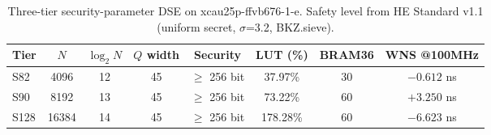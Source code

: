 \begin{table}[htbp]
\centering
\caption{Three-tier security-parameter DSE on xcau25p-ffvb676-1-e.
Safety level from HE Standard v1.1 (uniform secret, $\sigma$=3.2, BKZ.sieve).}
\label{tab:three_tier}
\footnotesize
\begin{tabular}{lccccccc}
\toprule
Tier & $N$ & $\log_2 N$ & $Q$ width & Security & LUT (\%) & BRAM36 & WNS @100MHz \\
\midrule
S82  & 4096  & 12 & 45 & $\ge$ 256 bit &  37.97\% & 30 & $-0.612$ ns \\
S90  & 8192  & 13 & 45 & $\ge$ 256 bit &  73.22\% & 60 & $+3.250$ ns \\
S128 & 16384 & 14 & 45 & $\ge$ 256 bit & 178.28\% & 60 & $-6.623$ ns \\
\bottomrule
\end{tabular}
\end{table}